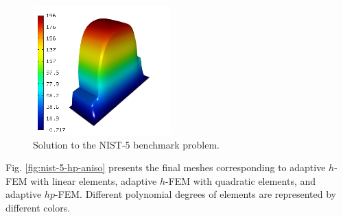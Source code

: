 \documentclass[12pt]{elsarticle}
\begin{document}
\begin{figure}[H]
\centering
\vspace{-3mm}
\includegraphics[height=5cm]{nist/nist-5/solution.png}
\vspace{-3mm}
\caption{Solution to the NIST-5 benchmark problem.}
\label{fig:sln-nist05}
\end{figure}

Fig. \ref{fig:nist-5-hp-aniso} presents the final meshes corresponding to adaptive $h$-FEM with
linear elements, adaptive $h$-FEM with quadratic elements, and adaptive $hp$-FEM. Different
polynomial degrees of elements are represented by different colors.
\end{document}
